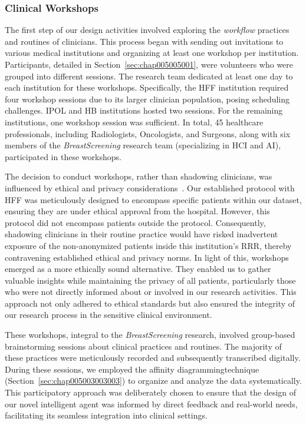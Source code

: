 \subsubsection{Clinical Workshops}
\label{sec:chap005003003001}

\textcolor{revised}{The first step of our design activities involved exploring the {\it workflow} practices and routines of clinicians.
This process began with sending out invitations to various medical institutions and organizing at least one workshop per institution.
Participants, detailed in Section~\ref{sec:chap005005001}, were volunteers who were grouped into different sessions.
The research team dedicated at least one day to each institution for these workshops.
Specifically, the \acs{HFF} institution required four workshop sessions due to its larger clinician population, posing scheduling challenges.
\acs{IPOL} and \acs{HB} institutions hosted two sessions.
For the remaining institutions, one workshop session was sufficient.
In total, 45 healthcare professionals, including Radiologists, Oncologists, and Surgeons, along with six members of the {\it BreastScreening} research team (specializing in \acs{HCI} and \acs{AI}), participated in these workshops.}

\textcolor{revised}{The decision to conduct workshops, rather than shadowing clinicians, was influenced by ethical and privacy considerations~\cite{10.1145/3449199}.
Our established protocol with \acs{HFF} was meticulously designed to encompass specific patients within our dataset, ensuring they are under ethical approval from the hospital.
However, this protocol did not encompass patients outside the protocol.
Consequently, shadowing clinicians in their routine practice would have risked inadvertent exposure of the non-anonymized patients inside this institution's \acs{RRR}, thereby contravening established ethical and privacy norms.
In light of this, workshops emerged as a more ethically sound alternative.
They enabled us to gather valuable insights while maintaining the privacy of all patients, particularly those who were not directly informed about or involved in our research activities.
This approach not only adhered to ethical standards but also ensured the integrity of our research process in the sensitive clinical environment.}

\textcolor{revised}{These workshops, integral to the {\it BreastScreening} research, involved group-based brainstorming sessions about clinical practices and routines.
The majority of these practices were meticulously recorded and subsequently transcribed digitally.
During these sessions, we employed the affinity diagramming\footnotemark[6] technique (Section~\ref{sec:chap005003003003}) to organize and analyze the data systematically.
This participatory approach was deliberately chosen to ensure that the design of our novel intelligent agent was informed by direct feedback and real-world needs, facilitating its seamless integration into clinical settings.}

